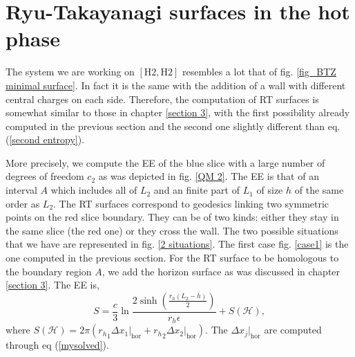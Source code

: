 \section{Ryu-Takayanagi surfaces in the hot phase}

The system we are working on $[\text{H}2,\text{H}2]$ resembles a lot that of fig. \ref{fig_BTZ minimal surface}. In fact it is the same with the addition of a wall with different central charges on each side. Therefore, the computation of RT surfaces is somewhat similar to those in chapter \ref{section 3}, with the first possibility already computed in the previous section and the second one slightly different than eq. (\ref{second entropy}). 

More precisely, we compute the EE of the blue slice with a large number of degrees of freedom $c_2$ as was depicted in fig. \ref{QM 2}. The EE is that of an interval $A$ which includes all of $L_2$ and an finite part of $L_1$ of size $h$ of the same order as $L_2$. The RT surfaces correspond to geodesics linking two symmetric points on the red slice boundary. They can be of two kinds: either they stay in the same slice (the red one) or they cross the wall. The two possible situations that we have are represented in fig. \ref{2 situations}. The first case fig. \ref{case1} is the one computed in the previous section. For the RT surface to be homologous to the boundary region $A$, we add the horizon surface as was discussed in chapter \ref{section 3}. The EE is,
\begin{equation}
    S = \frac{c}{3}\ln\frac{2\sinh\left(\frac{r_h(L_2-h)}{2}\right)}{r_h \epsilon} + S\left(\mathcal{H}\right),
\end{equation}
where $S\left(\mathcal{H}\right) = 2\pi \left({r_h}_1\Delta x_1\big|_\text{hor}+{r_h}_2\Delta x_2\big|_\text{hor}\right)$. The $\Delta x_j\big|_\text{hor}$ are computed through eq (\ref{mysolved}).

